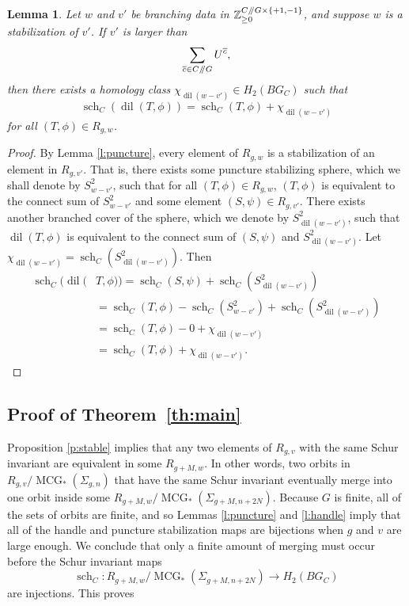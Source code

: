 \documentclass[10pt,twocolumn,amsmath,amssymb,aps,pra,secnumarabic,
    nofootinbib,groupedaddress]{revtex4-1}
\newtheorem{lemma}[theorem]{Lemma}
\newcommand{\Thm}[1]{Theorem~\ref{#1}}
\newcommand{\sslash}{\mathbin{/\mkern-5mu/}}
\newcommand{\dil}{\operatorname{dil}}
\newcommand{\MCG}{\operatorname{MCG}}
\newcommand{\sch}{\operatorname{sch}}
\begin{document}
\begin{lemma}
Let $w$ and $v'$ be branching data in $\mathbb{Z}_{\ge 0}^{C\sslash G \times \{+1,-1\}}$, and suppose $w$ is a stabilization of $v'$.  If $v'$ is larger than
\[ \sum_{\overline{c} \in C\sslash G} U^{\overline{c}}, \]
then there exists a homology class $\chi_{\dil(w-v')} \in H_2(BG_C)$ such that
\[ \sch_C(\dil(T,\phi)) = \sch_C(T,\phi) + \chi_{\dil(w-v')} \]
for all $(T,\phi) \in R_{g,w}$.
\label{l:dilhom}
\end{lemma} 

\begin{proof}
By Lemma \ref{l:puncture}, every element of $R_{g,w}$ is a stabilization of an element in $R_{g,v'}$.  That is, there exists some puncture stabilizing sphere, which we shall denote by $S^2_{w-v'}$, such that for all $(T,\phi) \in R_{g,w}$, $(T,\phi)$ is equivalent to the connect sum of $S^2_{w-v'}$ and some element $(S,\psi) \in R_{g,v'}$.  There exists another branched cover of the sphere, which we denote by $S^2_{\dil(w-v')}$, such that $\dil(T,\phi)$ is equivalent to the connect sum of $(S,\psi)$ and $S^2_{\dil(w-v')}$.  Let $\chi_{\dil(w-v')} = \sch_C(S^2_{\dil(w-v')})$.  Then
\[ \begin{aligned}
\sch_C(\dil(&T,\phi)) = \sch_C(S,\psi) + \sch_C(S^2_{\dil(w-v')}) \\
&=  \sch_C(T,\phi) - \sch_C(S^2_{w-v'}) + \sch_C(S^2_{\dil(w-v')}) \\
&= \sch_C(T,\phi) - 0 + \chi_{\dil(w-v')} \\
&= \sch_C(T,\phi) + \chi_{\dil(w-v')}.
\end{aligned} \]
\end{proof}

\subsection{Proof of \Thm{th:main}}
\label{ss:main}
Proposition \ref{p:stable} implies that any two elements of $R_{g,v}$ with the same Schur invariant are equivalent in some $R_{g+M,w}$.  In other words, two orbits in $R_{g,v}/\MCG_*(\Sigma_{g,n})$ that have the same Schur invariant eventually merge into one orbit inside some $R_{g+M,w}/\MCG_*(\Sigma_{g+M,n+2N})$.  Because $G$ is finite, all of the sets of orbits are finite, and so Lemmas \ref{l:puncture} and \ref{l:handle} imply that all of the handle and puncture stabilization maps are bijections when $g$ and $v$ are large enough.  We conclude that only a finite amount of merging must occur before the Schur invariant maps
\[ \sch_C: R_{g+M,w}/\MCG_*(\Sigma_{g+M,n+2N}) \to H_2(BG_C) \]
are injections.  This proves
\end{document}
